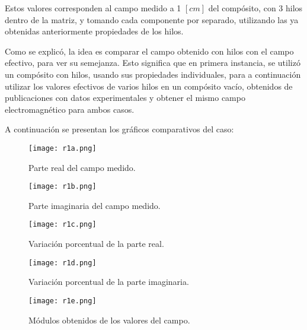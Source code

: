 \documentclass[12pt,letterpaper]{report}
\numberwithin{equation}{section}
\begin{document}


Estos valores corresponden al campo medido a 1 $[cm]$ del compósito, con 3 hilos dentro de la matriz, y tomando cada componente por separado, utilizando las ya obtenidas anteriormente propiedades de los hilos.

Como se explicó, la idea es comparar el campo obtenido con hilos con el campo efectivo, para ver su semejanza. Esto significa que en primera instancia, se utilizó un compósito con hilos, usando sus propiedades individuales, para a continuación utilizar los valores efectivos de varios hilos en un compósito vacío, obtenidos de publicaciones con datos experimentales \cite{Wire_theory_1} \cite{Wire_theory_2} y obtener el mismo campo electromagnético para ambos casos.

 A continuación se presentan los gráficos comparativos del caso:

\begin{figure}[H]
	\centering\texttt{[image: r1a.png]}\\
	\caption{Parte real del campo medido.}
	\label{fig:r1a}
\end{figure} 

\begin{figure}[H]
	\centering\texttt{[image: r1b.png]}\\
	\caption{Parte imaginaria del campo medido.}
	\label{fig:r1b}
\end{figure} 

\begin{figure}[H]
	\centering\texttt{[image: r1c.png]}\\
	\caption{Variación porcentual de la parte real.}
	\label{fig:r1c}
\end{figure} 

\begin{figure}[H]
	\centering\texttt{[image: r1d.png]}\\
	\caption{Variación porcentual de la parte imaginaria.}
	\label{fig: r1d}
\end{figure} 

\begin{figure}[H]
	\centering\texttt{[image: r1e.png]}\\
	\caption{Módulos obtenidos de los valores del campo.}
	\label{fig:r1e}
\end{figure} 
\end{document}
